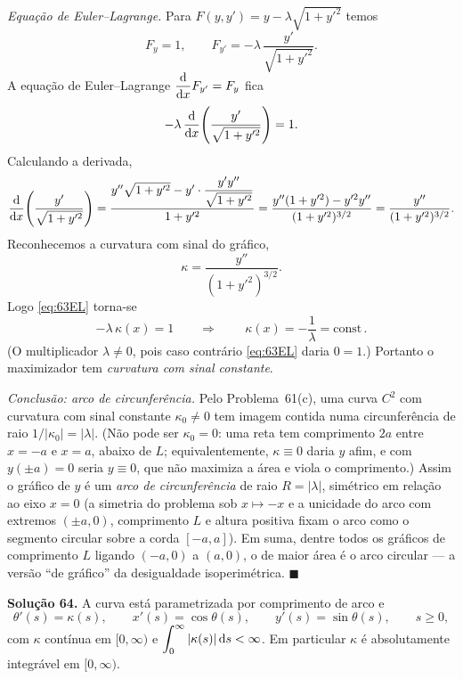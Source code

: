 \medskip
\noindent\emph{Equação de Euler--Lagrange.}
Para $F(y,y')=y-\lambda\sqrt{1+y'^2}$ temos
\[
F_y=1,\qquad F_{y'}=-\lambda\,\frac{y'}{\sqrt{1+y'^2}}.
\]
A equação de Euler--Lagrange $\dfrac{\mathrm{d}}{\mathrm{d} x}F_{y'}=F_y$ fica
\begin{equation}\label{eq:63EL}
-\lambda\,\frac{\mathrm{d}}{\mathrm{d} x}\!\left(\frac{y'}{\sqrt{1+y'^2}}\right)=1.
\end{equation}
Calculando a derivada,
\[
\frac{\mathrm{d}}{\mathrm{d} x}\!\left(\frac{y'}{\sqrt{1+y'^2}}\right)
=\frac{y''\sqrt{1+y'^2}-y'\cdot\dfrac{y'y''}{\sqrt{1+y'^2}}}{1+y'^2}
=\frac{y''(1+y'^2)-y'^2y''}{(1+y'^2)^{3/2}}
=\frac{y''}{(1+y'^2)^{3/2}}.
\]
Reconhecemos a curvatura com sinal do gráfico,
\[
\kappa=\frac{y''}{(1+y'^2)^{3/2}}.
\]
Logo \eqref{eq:63EL} torna-se
\[
-\lambda\,\kappa(x)=1\qquad\Longrightarrow\qquad
\boxed{\,\kappa(x)=-\frac1\lambda=\text{const}\,}.
\]
(O multiplicador $\lambda\neq0$, pois caso contrário \eqref{eq:63EL} daria $0=1$.) Portanto o maximizador tem \emph{curvatura com sinal constante}.

\medskip
\noindent\emph{Conclusão: arco de circunferência.}
Pelo Problema~61(c), uma curva $C^2$ com curvatura com sinal constante $\kappa_0\neq0$ tem imagem contida numa circunferência de raio $1/|\kappa_0|=|\lambda|$. (Não pode ser $\kappa_0=0$: uma reta tem comprimento $2a$ entre $x=-a$ e $x=a$, abaixo de $L$; equivalentemente, $\kappa\equiv0$ daria $y$ afim, e com $y(\pm a)=0$ seria $y\equiv0$, que não maximiza a área e viola o comprimento.) Assim o gráfico de $y$ é um \emph{arco de circunferência} de raio $R=|\lambda|$, simétrico em relação ao eixo $x=0$ (a simetria do problema sob $x\mapsto-x$ e a unicidade do arco com extremos $(\pm a,0)$, comprimento $L$ e altura positiva fixam o arco como o segmento circular sobre a corda $[-a,a]$). Em suma, dentre todos os gráficos de comprimento $L$ ligando $(-a,0)$ a $(a,0)$, o de maior área é o arco circular --- a versão ``de gráfico'' da desigualdade isoperimétrica. \qquad$\blacksquare$


\bigskip\noindent\textbf{Solução 64.}\quad
A curva está parametrizada por comprimento de arco e
\[
\theta'(s)=\kappa(s),\qquad x'(s)=\cos\theta(s),\qquad y'(s)=\sin\theta(s),\qquad s\ge0,
\]
com $\kappa$ contínua em $[0,\infty)$ e $\displaystyle\int_0^\infty|\kappa(s)|\,\mathrm{d} s<\infty$. Em particular $\kappa$ é absolutamente integrável em $[0,\infty)$.

